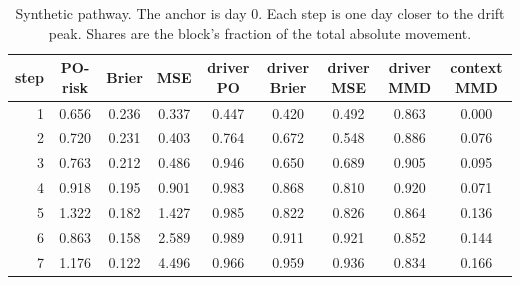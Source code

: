 
\begin{table}[t]
\centering
\caption{Synthetic pathway. The anchor is day 0. Each step is one day closer to the drift peak. Shares are the block's fraction of the total absolute movement.}
\label{tab:pathway-synthetic}
\begin{tabular}{rcccccccc}
\toprule
step & PO-risk & Brier & MSE & driver PO & driver Brier & driver MSE & driver MMD & context MMD \\
\midrule
1 & 0.656 & 0.236 & 0.337 & 0.447 & 0.420 & 0.492 & 0.863 & 0.000 \\
2 & 0.720 & 0.231 & 0.403 & 0.764 & 0.672 & 0.548 & 0.886 & 0.076 \\
3 & 0.763 & 0.212 & 0.486 & 0.946 & 0.650 & 0.689 & 0.905 & 0.095 \\
4 & 0.918 & 0.195 & 0.901 & 0.983 & 0.868 & 0.810 & 0.920 & 0.071 \\
5 & 1.322 & 0.182 & 1.427 & 0.985 & 0.822 & 0.826 & 0.864 & 0.136 \\
6 & 0.863 & 0.158 & 2.589 & 0.989 & 0.911 & 0.921 & 0.852 & 0.144 \\
7 & 1.176 & 0.122 & 4.496 & 0.966 & 0.959 & 0.936 & 0.834 & 0.166 \\
\bottomrule
\end{tabular}
\end{table}

\begin{table}[t]
\centering
\caption{Synthetic day 7, the drift peak. Deltas are the change in the loss when that block is replaced by the TabDDPM draw from the anchor conditional. Intervals are bootstrap percentiles. MMD and HSIC $p$-values use 40 permutations.}
\label{tab:pathway-synthetic-day7}
\small
{}
\end{table}

